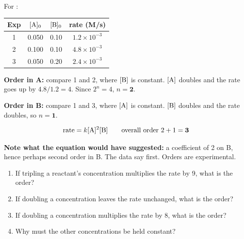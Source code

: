 \documentclass{apchem-worksheet}
\begin{document}
\begin{workedexample}
For :

\begin{center}
\begin{tabular}{cccc}
\hline
\textbf{Exp} & $[\ce{A}]_0$ & $[\ce{B}]_0$ & \textbf{rate} (M/s) \\
\hline
1 & 0.050 & 0.10 & $1.2\times10^{-3}$ \\
2 & 0.100 & 0.10 & $4.8\times10^{-3}$ \\
3 & 0.050 & 0.20 & $2.4\times10^{-3}$ \\
\hline
\end{tabular}
\end{center}

\textbf{Order in A:} compare 1 and 2, where $[\ce{B}]$ is constant.
$[\ce{A}]$ doubles and the rate goes up by
$4.8/1.2 = 4$. Since $2^n = 4$, $n = \mathbf{2}$.

\textbf{Order in B:} compare 1 and 3, where $[\ce{A}]$ is constant.
$[\ce{B}]$ doubles and the rate doubles, so $n = \mathbf{1}$.

\[ \text{rate} = k[\ce{A}]^2[\ce{B}] \qquad
   \text{overall order } 2 + 1 = \mathbf{3} \]

\textbf{Note what the equation would have suggested:} a coefficient of 2
on B, hence perhaps second order in B. The data say first. Orders are
experimental.
\end{workedexample}

\begin{yourturn}
\begin{enumerate}[leftmargin=*,itemsep=0.5em]
  \item If tripling a reactant's concentration multiplies the rate by 9,
        what is the order? \workspace[1.4cm]
  \item If doubling a concentration leaves the rate unchanged, what is the
        order? \workspace[1.4cm]
  \item If doubling a concentration multiplies the rate by 8, what is the
        order? \workspace[1.4cm]
  \item Why must the other concentrations be held constant?
        \workspace[1.6cm]
\end{enumerate}
\end{yourturn}
\end{document}
